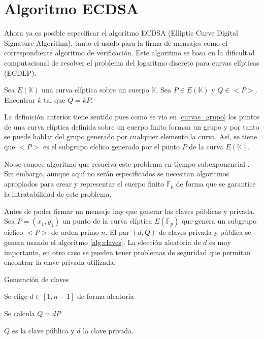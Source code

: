 \section{Algoritmo ECDSA}

Ahora ya es posible especificar el algoritmo ECDSA (Elliptic Curve Digital Signature Algorithm)\citep{elliptic_cripto}, tanto el usado para la firma de mensajes como el correspondiente algoritmo de verificación. Este algoritmo se basa en la dificultad computacional de resolver el problema del logaritmo discreto para curvas elípticas (ECDLP).

\theoremstyle{definition}\begin{definition}\label{ecdlp} Sea $E(\mathbb{K})$ una curva elíptica sobre un cuerpo $\mathbb{K}$. Sea $P \in E(\mathbb{K})$ y $Q  \in  <P>$. Encontrar $k$ tal que $Q= kP$. \end{definition}

La definición anterior tiene sentido pues como se vio en \ref{curvas_grupo} los puntos de una curva elíptica definida sobre un cuerpo finito forman un grupo y por tanto se puede hablar del grupo generado por cualquier elemento la curva. Así, se tiene que $<P>$ es el subgrupo cíclico generado por el punto $P$ de la curva $E(\mathbb{K})$. 

No se conoce algoritmo que resuelva este problema en tiempo subexponencial \citep{discrete_log}. Sin embargo, aunque aquí no serán especificados se necesitan algoritmos apropiados para crear y representar el cuerpo finito $\mathbb{F}_{p}$ de forma que se garantice la intratabilidad de este problema.

Antes de poder firmar un mensaje hay que generar las claves públicas y privada.
Sea $P = (x_{1},y_{1})$ un punto de la curva elíptica $E(\mathbb{F}_{p})$ que genera un subgrupo cíclico $<P>$ de orden primo $n$. El par $(d,Q)$ de claves privada y pública se genera usando el algoritmo \ref{alg:claves}. La elección aleatoria de $d$ es muy importante, en otro caso se pueden tener problemas de seguridad que permitan encontrar la clave privada utilizada.
\begin{algorithm}
\caption{Generación de claves}\label{alg:claves}
\begin{algorithmic}[1]

\State Se elige $d \in [1, n-1]$ de forma aleatoria

\State Se calcula $Q=dP$

\State  $Q$ es la clave pública y $d$ la clave privada.
\end{algorithmic}
\end{algorithm}



